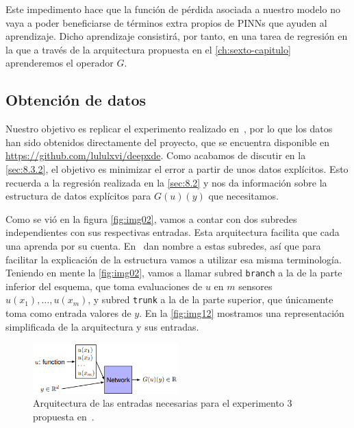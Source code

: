 Este impedimento hace que la función de pérdida asociada a nuestro modelo no vaya a poder beneficiarse de términos extra propios de PINNs que ayuden al aprendizaje. Dicho aprendizaje consistirá, por tanto, en una tarea de regresión en la que a través de la arquitectura propuesta en el \autoref{ch:sexto-capitulo} aprenderemos el operador $G$. 

\subsection{Obtención de datos}\label{sec:8.4.3}

Nuestro objetivo es replicar el experimento realizado en~\cite{lu2024deeponet}, por lo que los datos han sido obtenidos directamente del proyecto, que se encuentra disponible en \hyperlink{https://github.
com/lululxvi/deepxde}{https://github.com/lululxvi/deepxde}. Como acabamos de discutir en la \autoref{sec:8.3.2}, el objetivo es minimizar el error a partir de unos datos explícitos. Esto recuerda a la regresión realizada en la \autoref{sec:8.2} y nos da información sobre la estructura de datos explícitos para $G(u)(y)$ que necesitamos.

Como se vió en la figura \autoref{fig:img02}, vamos a contar con dos subredes independientes con sus respectivas entradas. Esta arquitectura facilita que cada una aprenda por su cuenta. En~\cite{lu2024deeponet} dan nombre a estas subredes, así que para facilitar la explicación de la estructura vamos a utilizar esa misma terminología. Teniendo en mente la \autoref{fig:img02}, vamos a llamar subred \texttt{branch} a la de la parte inferior del esquema, que toma evaluaciones de $u$ en $m$ sensores $u(x_{1}),\dots,u(x_{m})$, y subred \texttt{trunk} a la de la parte superior, que únicamente toma como entrada valores de $y$. En la \autoref{fig:img12} mostramos una representación simplificada de la arquitectura y sus entradas.


 \begin{figure}[htbp]
    \centering
    \includegraphics[width=0.5\textwidth]{img/img12.png}
    \caption{Arquitectura de las entradas necesarias para el experimento 3 propuesta en~\cite{lu2024deeponet}.}
    \label{fig:img12}
\end{figure}

